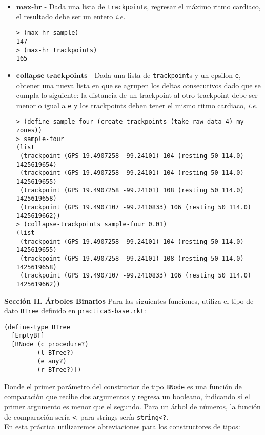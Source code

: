 \documentclass{article}
\begin{document}
\begin{itemize}
\item $\textbf{max-hr}$ - Dada una lista de \verb;trackpoint;s, regresar el máximo ritmo cardiaco, el resultado debe ser un entero \textit{i.e.}
\begin{verbatim}
> (max-hr sample)
147
> (max-hr trackpoints)
165
\end{verbatim}

\item $\textbf{collapse-trackpoints}$ - Dada una lista de \verb;trackpoint;s y un epsilon \verb;e;, obtener una nueva lista en que se agrupen los deltas consecutivos dado que se cumpla lo siguiente: la distancia de un trackpoint al otro trackpoint debe ser menor o igual a \verb;e; y los trackpoints deben tener el mismo ritmo cardiaco, \textit{i.e.}
\begin{verbatim}
> (define sample-four (create-trackpoints (take raw-data 4) my-zones))
> sample-four
(list
 (trackpoint (GPS 19.4907258 -99.24101) 104 (resting 50 114.0) 1425619654)
 (trackpoint (GPS 19.4907258 -99.24101) 104 (resting 50 114.0) 1425619655)
 (trackpoint (GPS 19.4907258 -99.24101) 108 (resting 50 114.0) 1425619658)
 (trackpoint (GPS 19.4907107 -99.2410833) 106 (resting 50 114.0) 1425619662))
> (collapse-trackpoints sample-four 0.01)
(list
 (trackpoint (GPS 19.4907258 -99.24101) 104 (resting 50 114.0) 1425619655)
 (trackpoint (GPS 19.4907258 -99.24101) 108 (resting 50 114.0) 1425619658)
 (trackpoint (GPS 19.4907107 -99.2410833) 106 (resting 50 114.0) 1425619662))
\end{verbatim}

\end{itemize}

\textbf{Sección II. Árboles Binarios}
Para las siguientes funciones, utiliza el tipo de dato \verb;BTree;
definido en \verb;practica3-base.rkt;:
\begin{verbatim}
(define-type BTree
  [EmptyBT]
  [BNode (c procedure?)
         (l BTree?)
         (e any?)
         (r BTree?)])
\end{verbatim}

Donde el primer parámetro del constructor de tipo \verb;BNode; es una función de comparación que recibe dos argumentos y regresa un booleano, indicando si el primer argumento es menor que el segundo. Para un árbol de números, la función de comparación sería \verb;<;, para strings sería \verb;string<?;. \\
    
En esta práctica utilizaremos abreviaciones para los constructores de tipos:
\end{document}
